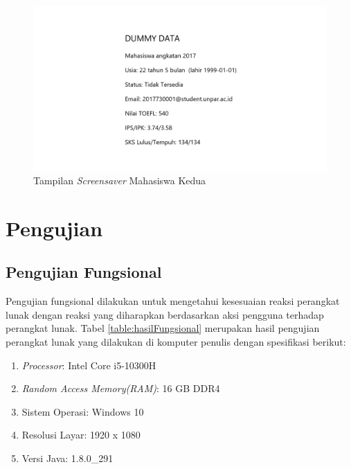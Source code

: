 \begin{figure}[H]
	\centering
	\includegraphics[scale=0.3]{Gambar/hasil2.png}
	\caption{Tampilan \textit{Screensaver} Mahasiswa Kedua}
	\label{fig:5_hasil2}
\end{figure}


\section{Pengujian}

\subsection{Pengujian Fungsional}
Pengujian fungsional dilakukan untuk mengetahui kesesuaian reaksi perangkat lunak dengan reaksi yang diharapkan berdasarkan aksi pengguna terhadap perangkat lunak. Tabel \ref{table:hasilFungsional} merupakan hasil pengujian perangkat lunak yang dilakukan di komputer penulis dengan spesifikasi berikut:
\begin{enumerate}
    \item \textit{Processor}: Intel Core i5-10300H
    \item \textit{Random Access Memory(RAM)}: 16 GB DDR4
    \item Sistem Operasi: Windows 10
    \item Resolusi Layar: 1920 x 1080
    \item Versi Java: 1.8.0\_291
\end{enumerate}

